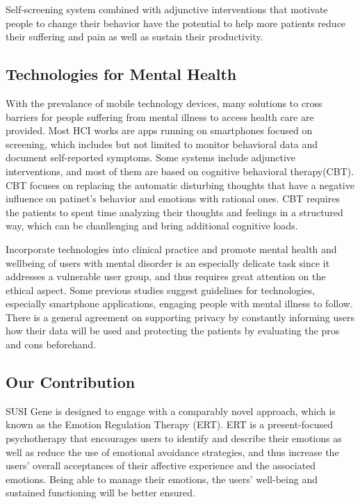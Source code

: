 \documentclass[manuscript,screen]{acmart}
\begin{document}
Self-screening system combined with adjunctive interventions that motivate people to change their behavior have the potential to help more patients reduce their suffering and pain as well as sustain their productivity.\cite{arnrich2010pervasive}

\subsection{Technologies for Mental Health}
With the prevalance of mobile technology devices, many solutions to cross barriers for people suffering from mental illness to access health care are provided. Most HCI works are apps running on smartphones focused on screening, which includes but not limited to monitor behavioral data and document self-reported symptoms. Some systems include adjunctive interventions, and most of them are based on cognitive behavioral therapy(CBT).\cite{sanches2019hci} CBT focuses on replacing the automatic disturbing thoughts that have a negative influence on patinet's behavior and emotions with rational ones. CBT requires the patients to spent time analyzing their thoughts and feelings in a structured way, which can be chanllenging and bring additional cognitive loads.

Incorporate technologies into clinical practice and promote mental health and wellbeing of users with mental disorder is an especially delicate task since it addresses a vulnerable user group, and thus requires great attention on the ethical aspect.\cite{sanches2019hci} Some previous studies suggest guidelines for technologies, especially smartphone applications, engaging people with mental illness to follow. There is a general agreement on supporting privacy by constantly informing users how their data will be used and protecting the patients by evaluating the pros and cons beforehand.\cite{sanches2019hci}\cite{torous2017ethical}

\subsection{Our Contribution}
SUSI Gene is designed to engage with a comparably novel approach, which is known as the Emotion Regulation Therapy (ERT). ERT is a present-focused psychotherapy that encourages users to identify and describe their emotions as well as reduce the use of emotional avoidance strategies, and thus increase the users' overall acceptances of their affective experience and the associated emotions.\cite{mennin2014emotion} Being able to manage their emotions, the users' well-being and sustained functioning will be better ensured. 
\end{document}

